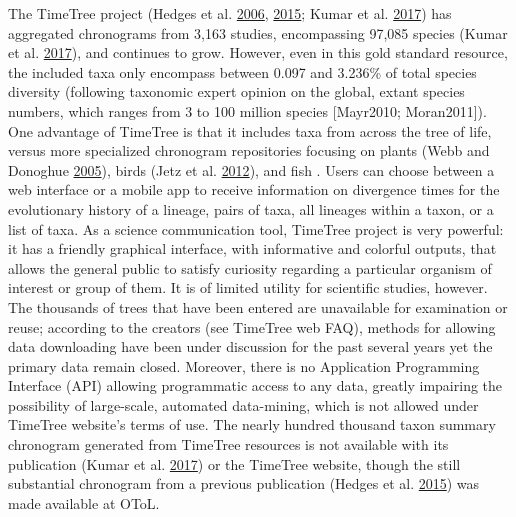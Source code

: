 \documentclass[]{article}
\begin{document}
The TimeTree project (Hedges et al. \protect\hyperlink{ref-Hedges2006}{2006}, \protect\hyperlink{ref-Hedges2015}{2015}; Kumar et al. \protect\hyperlink{ref-Kumar2017}{2017}) has aggregated chronograms
from 3,163 studies, encompassing 97,085 species (Kumar et al. \protect\hyperlink{ref-Kumar2017}{2017}), and continues to grow.
However, even in this gold standard resource, the included taxa only encompass between
0.097 and 3.236\% of total species diversity (following taxonomic expert opinion
on the global, extant species numbers, which ranges from 3 to 100 million species
{[}Mayr2010; Moran2011{]}). One advantage of TimeTree is that it includes taxa from
across the tree of life, versus more specialized chronogram repositories focusing on plants
(Webb and Donoghue \protect\hyperlink{ref-webb2005phylomatic}{2005}), birds (Jetz et al. \protect\hyperlink{ref-Jetz2012}{2012}), and fish . Users can choose
between a web interface or a mobile app to receive information on divergence times
for the evolutionary history of a lineage, pairs of taxa, all lineages within a
taxon, or a list of taxa. As a science communication tool, TimeTree project is
very powerful: it has a friendly graphical interface, with informative and colorful
outputs, that allows the general public to satisfy curiosity regarding a particular
organism of interest or group of them. It is of limited utility for scientific
studies, however. The thousands of trees that have been entered are unavailable
for examination or reuse; according to the creators (see TimeTree web FAQ), methods
for allowing data downloading have been under discussion for the past several years
yet the primary data remain closed. Moreover, there is no Application Programming
Interface (API) allowing programmatic access to any data, greatly impairing the
possibility of large-scale, automated data-mining, which is not allowed under TimeTree
website's terms of use. The nearly hundred thousand taxon summary chronogram generated
from TimeTree resources is not available with its publication (Kumar et al. \protect\hyperlink{ref-Kumar2017}{2017}) or the
TimeTree website, though the still substantial chronogram from a previous publication
(Hedges et al. \protect\hyperlink{ref-Hedges2015}{2015}) was made available at OToL.
\end{document}
